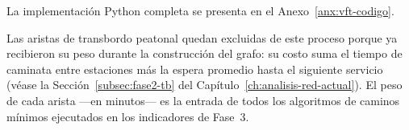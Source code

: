 La implementación Python completa se presenta en el Anexo~\ref{anx:vft-codigo}.

Las aristas de transbordo peatonal quedan excluidas de este proceso porque ya
recibieron su peso durante la construcción del grafo: su costo suma el tiempo de
caminata entre estaciones más la espera promedio hasta el siguiente servicio
(véase la Sección~\ref{subsec:fase2-tb} del
Capítulo~\ref{ch:analisis-red-actual}). El peso de cada arista —en minutos— es la entrada
de todos los algoritmos de caminos mínimos ejecutados en los indicadores de
Fase~3.
